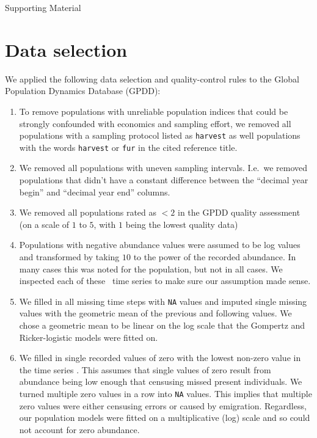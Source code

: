 
\begin{centering}
\LARGE
Supporting Material\\[1.0em]
\end{centering}

\section{Data selection}

We applied the following data selection and quality-control rules to the Global
Population Dynamics Database (GPDD):

\begin{enumerate}

\item To remove populations with unreliable population indices that could be
  strongly confounded with economics and sampling effort, we removed all
  populations with a sampling protocol listed as \texttt{harvest} as well
  populations with the words \texttt{harvest} or \texttt{fur} in the cited
  reference title.

\item We removed all populations with uneven sampling intervals. I.e.~we removed
  populations that didn't have a constant difference between the ``decimal year
  begin'' and ``decimal year end'' columns.

\item We removed all populations rated as $< 2$ in the GPDD quality assessment
  (on a scale of $1$ to $5$, with $1$ being the lowest quality data)
  \citep[following][]{sibly2005, ziebarth2010}

\item Populations with negative abundance values were assumed to be log values
  and transformed by taking $10$ to the power of the recorded abundance. In many
  cases this was noted for the population, but not in all cases. We inspected
  each of these \totalAssumedLog~time series to make sure our assumption made
  sense.

\item We filled in all missing time steps with \texttt{NA} values and imputed
  single missing values with the geometric mean of the previous and following
  values. We chose a geometric mean to be linear on the log scale that the
  Gompertz and Ricker-logistic models were fitted on.

\item We filled in single recorded values of zero with the lowest non-zero value
  in the time series \citep[following][]{brook2006a}. This assumes that single
  values of zero result from abundance being low enough that censusing missed
  present individuals. We turned multiple zero values in a row into \texttt{NA}
  values. This implies that multiple zero values were either censusing errors or
  caused by emigration. Regardless, our population models were fitted on
  a multiplicative (log) scale and so could not account for zero abundance.


\end{enumerate}
